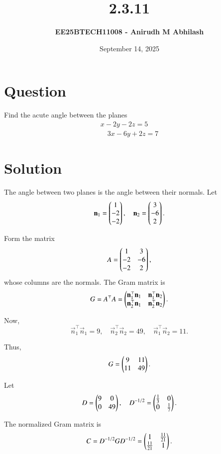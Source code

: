 \documentclass[12pt]{article}
\title{\textbf{2.3.11}}
\author{\textbf{EE25BTECH11008 - Anirudh M Abhilash}}
\date{September 14, 2025}
\begin{document}
\maketitle
\section*{Question}

Find the acute angle between the planes 
\begin{align*}
x - 2y - 2z = 5 \\
\quad 3x - 6y + 2z = 7
\end{align*}

\section*{Solution}

The angle between two planes is the angle between their normals.
Let
\[
\mathbf{n}_1 = \begin{pmatrix}1 \\ -2 \\ -2\end{pmatrix}, 
\quad \mathbf{n}_2 = \begin{pmatrix}3 \\ -6 \\ 2\end{pmatrix}.
\]

Form the matrix\
\begin{align}
A = \begin{pmatrix}1 & 3 \\ -2 & -6 \\ -2 & 2\end{pmatrix},
\end{align}
whose columns are the normals.  
The Gram matrix is
\begin{align}
G = A^\top A 
= \begin{pmatrix}\mathbf{n}_1^\top \mathbf{n}_1 & \mathbf{n}_1^\top \mathbf{n}_2 \\ \mathbf{n}_2^\top \mathbf{n}_1 & \mathbf{n}_2^\top \mathbf{n}_2\end{pmatrix}.
\end{align}

Now,
\[
\vec{n}_1^\top \vec{n}_1 = 9, \quad 
\vec{n}_2^\top \vec{n}_2 = 49, \quad 
\vec{n}_1^\top \vec{n}_2 = 11.
\]

Thus,
\begin{align}
G = \begin{pmatrix}9 & 11 \\ 11 & 49\end{pmatrix}.
\end{align}


Let
\begin{align}
D = \begin{pmatrix}9 & 0 \\ 0 & 49\end{pmatrix}, 
\quad D^{-1/2} = \begin{pmatrix}\tfrac{1}{3} & 0 \\ 0 & \tfrac{1}{7}\end{pmatrix}.
\end{align}


The normalized Gram matrix is
\begin{align}
C = D^{-1/2} G D^{-1/2} 
= \begin{pmatrix}1 & \tfrac{11}{21} \\ \tfrac{11}{21} & 1\end{pmatrix}.
\end{align}
\end{document}
